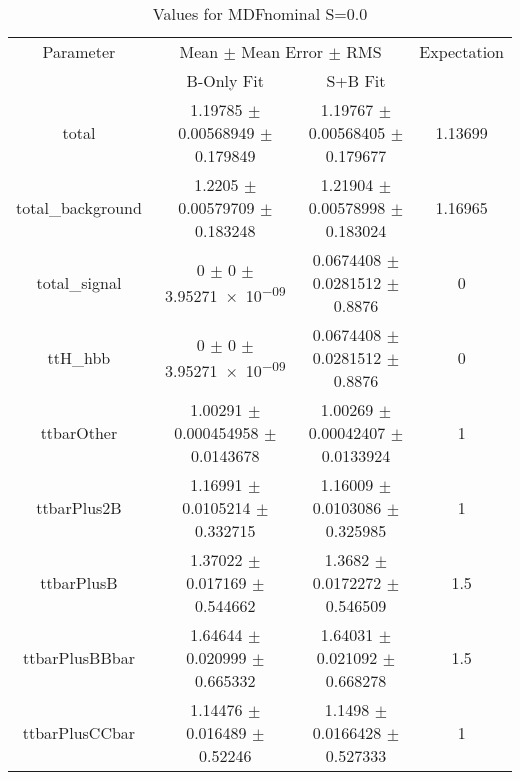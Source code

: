 \begin{table}
\centering
\caption{Values for MDFnominal S=0.0}
\begin{tabular}{cccc}
\toprule
Parameter & \multicolumn{2}{c}{Mean $\pm$ Mean Error $\pm$ RMS} & Expectation\\
 & B-Only Fit & S+B Fit & \\
\midrule
total & \num{1.19785} $\pm$ \num{0.00568949} $\pm$ \num{0.179849} & \num{1.19767} $\pm$ \num{0.00568405} $\pm$ \num{0.179677} & \num{1.13699}\\
total\_background & \num{1.2205} $\pm$ \num{0.00579709} $\pm$ \num{0.183248} & \num{1.21904} $\pm$ \num{0.00578998} $\pm$ \num{0.183024} & \num{1.16965}\\
total\_signal & \num{0} $\pm$ \num{0} $\pm$ \num{3.95271e-09} & \num{0.0674408} $\pm$ \num{0.0281512} $\pm$ \num{0.8876} & \num{0}\\
ttH\_hbb & \num{0} $\pm$ \num{0} $\pm$ \num{3.95271e-09} & \num{0.0674408} $\pm$ \num{0.0281512} $\pm$ \num{0.8876} & \num{0}\\
ttbarOther & \num{1.00291} $\pm$ \num{0.000454958} $\pm$ \num{0.0143678} & \num{1.00269} $\pm$ \num{0.00042407} $\pm$ \num{0.0133924} & \num{1}\\
ttbarPlus2B & \num{1.16991} $\pm$ \num{0.0105214} $\pm$ \num{0.332715} & \num{1.16009} $\pm$ \num{0.0103086} $\pm$ \num{0.325985} & \num{1}\\
ttbarPlusB & \num{1.37022} $\pm$ \num{0.017169} $\pm$ \num{0.544662} & \num{1.3682} $\pm$ \num{0.0172272} $\pm$ \num{0.546509} & \num{1.5}\\
ttbarPlusBBbar & \num{1.64644} $\pm$ \num{0.020999} $\pm$ \num{0.665332} & \num{1.64031} $\pm$ \num{0.021092} $\pm$ \num{0.668278} & \num{1.5}\\
ttbarPlusCCbar & \num{1.14476} $\pm$ \num{0.016489} $\pm$ \num{0.52246} & \num{1.1498} $\pm$ \num{0.0166428} $\pm$ \num{0.527333} & \num{1}\\
\bottomrule
\end{tabular}
\end{table}